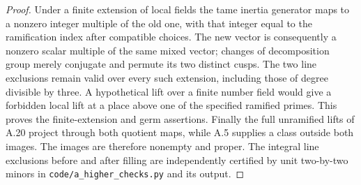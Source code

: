 \begin{proof}
Under a finite extension of local fields the tame inertia
generator maps to a nonzero integer multiple of the old
one, with that integer equal to the ramification index
after compatible choices. The new vector is consequently
a nonzero scalar multiple of the same mixed vector;
changes of decomposition group merely conjugate and
permute its two distinct cusps. The two line exclusions
remain valid over every such extension, including those
of degree divisible by three. A hypothetical lift over
a finite number field would give a forbidden local lift
at a place above one of the specified ramified primes.
This proves the finite-extension and germ assertions.
Finally the full unramified lifts of A.20 project through
both quotient maps, while A.5 supplies a class outside
both images. The images are therefore nonempty and proper.
The integral line exclusions before and after filling are
independently certified by unit two-by-two minors in
\texttt{code/a\_higher\_checks.py} and its output.
\end{proof}

